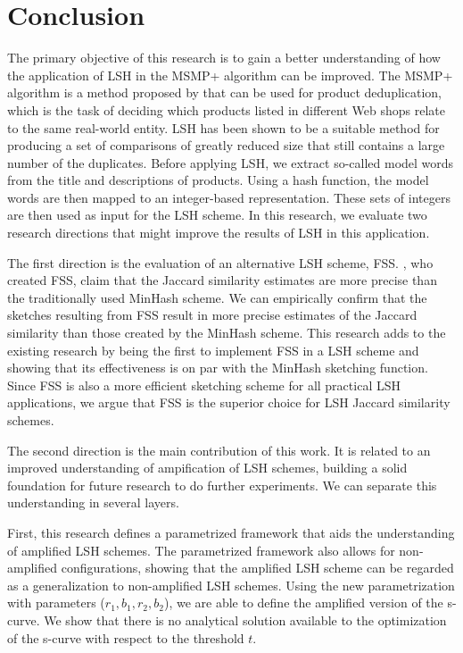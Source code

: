 \chapter{Conclusion}
\label{chap:conclusion}
The primary objective of this research is to gain a better understanding of how the application of LSH in the MSMP+ algorithm can be improved. The MSMP+ algorithm is a method proposed by \cite{HartveldKMNPFS18} that can be used for product deduplication, which is the task of deciding which products listed in different Web shops relate to the same real-world entity. LSH has been shown to be a suitable method for producing a set of comparisons of greatly reduced size that still contains a large number of the duplicates. Before applying LSH, we extract so-called model words from the title and descriptions of products. Using a hash function, the model words are then mapped to an integer-based representation. These sets of integers are then used as input for the LSH scheme. In this research, we evaluate two research directions that might improve the results of LSH in this application. 

The first direction is the evaluation of an alternative LSH scheme, FSS. \cite{DahlgaardKT17}, who created FSS, claim that the Jaccard similarity estimates are more precise than the traditionally used MinHash scheme. We can empirically confirm that the sketches resulting from FSS result in more precise estimates of the Jaccard similarity than those created by the MinHash scheme. This research adds to the existing research by being the first to implement FSS in a LSH scheme and showing that its effectiveness is on par with the MinHash sketching function. Since FSS is also a more efficient sketching scheme for all practical LSH applications, we argue that FSS is the superior choice for LSH Jaccard similarity schemes.

The second direction is the main contribution of this work. It is related to an improved understanding of ampification of LSH schemes, building a solid foundation for future research to do further experiments. We can separate this understanding in several layers. 

First, this research defines a parametrized framework that aids the understanding of amplified LSH schemes. The parametrized framework also allows for non-amplified configurations, showing that the amplified LSH scheme can be regarded as a generalization to non-amplified LSH schemes. Using the new parametrization with parameters ($r_1,b_1,r_2,b_2$), we are able to define the amplified version of the s-curve. We show that there is no analytical solution available to the optimization of the s-curve with respect to the threshold $t$.


